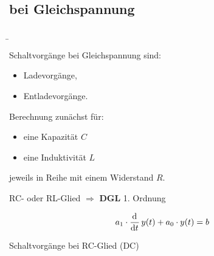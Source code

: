 \subsection{bei Gleichspannung}
\label{sec:schaltvorgaengezeitbereich:dc}
\begin{frame}
%
\b{%
    \centering
    \begin{minipage}{0.48\textwidth}%
        Schaltvorgänge bei Gleichspannung sind:
        \vspace{0.5em}
        \begin{itemize}
            \item Ladevorgänge,
            \item Entladevorgänge.
        \end{itemize}
        \vspace{0.5em}
        \pause
        Berechnung zunächst für:
        \vspace{0.5em}
        \begin{itemize}
            \item eine Kapazität $C$
            \item eine Induktivität $L$
        \end{itemize}
        \vspace{0.5em}
        jeweils in Reihe mit einem Widerstand $R$.
        \pause

        \vspace{1em}
        RC- oder RL-Glied $\Longrightarrow$ \textbf{DGL} 1. Ordnung

        \begin{equation*}
            a_1 \cdot \frac{\mathrm{d}^{{}}}{\mathrm{d}t^{{}}}\, y(t) + a_0 \cdot y(t) = b
        \end{equation*}
    \end{minipage}%
    \begin{minipage}{0.48\textwidth}\centering
        \pause
        Schaltvorgänge bei RC-Glied (DC)
    \end{minipage}
}%
\end{frame}

